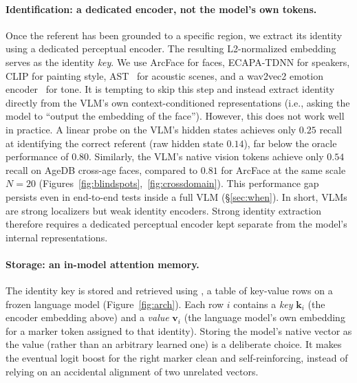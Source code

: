 \paragraph{Identification: a dedicated encoder, not the model's own tokens.} Once the referent has been grounded to a specific region, we extract its identity using a dedicated perceptual encoder. The resulting L2-normalized embedding serves as the identity \emph{key}. We use ArcFace for faces, ECAPA-TDNN for speakers, CLIP for painting style, AST~\citep{ast} for acoustic scenes, and a wav2vec2 emotion encoder~\citep{wav2vec2} for tone. It is tempting to skip this step and instead extract identity directly from the VLM's own context-conditioned representations (i.e., asking the model to ``output the embedding of the face''). However, this does not work well in practice. A linear probe on the VLM's hidden states achieves only $0.25$ recall at identifying the correct referent (raw hidden state $0.14$), far below the oracle performance of $0.80$. Similarly, the VLM's native vision tokens achieve only $0.54$ recall on AgeDB cross-age faces, compared to $0.81$ for ArcFace at the same scale $N{=}20$ (Figures~\ref{fig:blindspots},~\ref{fig:crossdomain}). This performance gap persists even in end-to-end tests inside a full VLM (\S\ref{sec:when}). In short, VLMs are strong localizers but weak identity encoders. Strong identity extraction therefore requires a dedicated perceptual encoder kept separate from the model's internal representations.

\paragraph{Storage: an in-model attention memory.} The identity key is stored and retrieved using \attmem{}, a table of key-value rows on a frozen language model (Figure~\ref{fig:arch}). Each row $i$ contains a \emph{key} $\bm{k}_i$ (the encoder embedding above) and a \emph{value} $\bm{v}_i$ (the language model's own embedding for a marker token assigned to that identity). Storing the model's native vector as the value (rather than an arbitrary learned one) is a deliberate choice. It makes the eventual logit boost for the right marker clean and self-reinforcing, instead of relying on an accidental alignment of two unrelated vectors.

